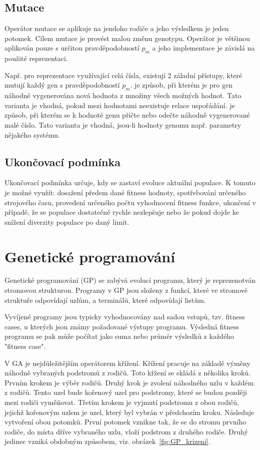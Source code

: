 \subsection{Mutace}
Operátor mutace se aplikuje na jendoho rodiče a jeho výsledkem je jeden potomek.
Cílem mutace je provést malou změnu genotypu.
Operátor je většinou aplikován pouze s určitou pravděpodobností $p_m$ a jeho implementace je závislá na použité reprezentaci.


Např. pro reprezentace využívající celá čísla, existují 2 záladní přístupy, které mutují každý gen s pravděpodobností $p_m$.
 je způsob, při kterém je pro gen náhodně vygenerována nová hodnota z množiny všech možných hodnot.
Tato varianta je vhodná, pokud mezi hodnotami neexistuje relace uspořádání.
 je způsob, při kterém se k hodnotě genu přičte nebo odečte náhodně vygenerované malé číslo.
Tato varianta je vhodná, jsou-li hodnoty genomu např. parametry nějakého systému.

\subsection{Ukončovací podmínka}
Ukončovací podmínka určuje, kdy se zastaví evoluce aktuální populace.
K tomuto je možné využít: dosažení předem dané fitness hodnoty, spotřebování určeného strojového času, provedení určeného počtu vyhodnocení fitness funkce, ukončení v případě, že se populace dostatečně rychle nezlepšuje nebo že pokud dojde ke snížení diverzity populace po daný limit.

\section{Genetické programování}
Genetické programování (GP) se zabývá evolucí programu, který je reprezenotván stromovou strukturou.
Programy v GP jsou složeny z funkcí, které ve stromové struktuře odpovídají uzlům, a terminálů, které odpovídají listům.

Vyvíjené programy jsou typicky vyhodnocovány nad sadou vstupů, tzv. fitness cases, u kterých jsou známy požadované výstupy programu.
Výsledná fitness programu se pak může počítat jako suma nebo průměr výsledků z každého "fitness case".

V GA je nejdůležitějším operátorem křížení.
Křížení pracuje na základě výměny náhodně vybraných podstromů z rodičů.
Toto křžení se skládá z několika kroků.
Prvním krokem je výběr rodičů.
Druhý krok je zvolení náhodného uzlu v každém z rodičů.
Tento uzel bude kořenový uzel pro podstromy, které se budou později mezi rodiči vyměňovat.
Třetím krokem je vyjmutí podstromu z obou rodičů, jejichž kořenovým uzlem je uzel, který byl vybrán v předchozím kroku.
Následuje vytvoření obou potomků.
První potomek vznikne tak, že se do stromu prvního rodiče, do místa dříve vybraného uzlu, vloží podstrom z druhého rodiče.
Druhý jedinec vzniká obdobným způsobem, viz. obrázek~\ref{fig:GP_krizeni}.

